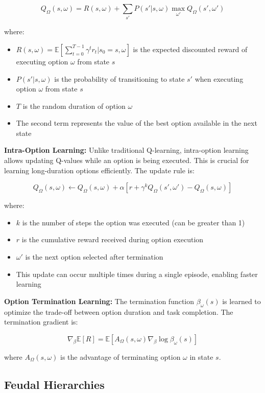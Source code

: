 \documentclass[12pt]{article}
\begin{document}
{{\[
Q_\Omega(s,\omega) = R(s,\omega) + \sum_{s'} P(s'|s,\omega) \max_{\omega'} Q_\Omega(s',\omega')
\]

where:
\begin{itemize}
    \item $R(s,\omega) = \mathbb{E}[\sum_{t=0}^{T-1} \gamma^t r_t | s_0 = s, \omega]$ is the expected discounted reward of executing option $\omega$ from state $s$
    \item $P(s'|s,\omega)$ is the probability of transitioning to state $s'$ when executing option $\omega$ from state $s$
    \item $T$ is the random duration of option $\omega$
    \item The second term represents the value of the best option available in the next state
\end{itemize}

\textbf{Intra-Option Learning:}
Unlike traditional Q-learning, intra-option learning allows updating Q-values while an option is being executed. This is crucial for learning long-duration options efficiently. The update rule is:

\[
Q_\Omega(s,\omega) \leftarrow Q_\Omega(s,\omega) + \alpha[r + \gamma^k Q_\Omega(s',\omega') - Q_\Omega(s,\omega)]
\]

where:
\begin{itemize}
    \item $k$ is the number of steps the option was executed (can be greater than 1)
    \item $r$ is the cumulative reward received during option execution
    \item $\omega'$ is the next option selected after termination
    \item This update can occur multiple times during a single episode, enabling faster learning
\end{itemize}

\textbf{Option Termination Learning:}
The termination function $\beta_\omega(s)$ is learned to optimize the trade-off between option duration and task completion. The termination gradient is:

\[
\nabla_\beta \mathbb{E}[R] = \mathbb{E}[A_\Omega(s,\omega) \nabla_\beta \log \beta_\omega(s)]
\]

where $A_\Omega(s,\omega)$ is the advantage of terminating option $\omega$ in state $s$.

\subsection{Feudal Hierarchies}

}}
\end{document}
